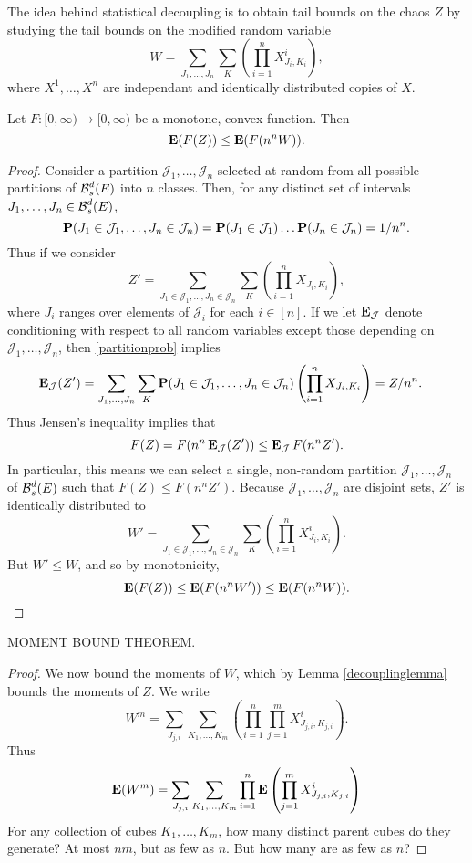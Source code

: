 The idea behind statistical decoupling is to obtain tail bounds on the chaos $Z$ by studying the tail bounds on the modified random variable
%
\[ W = \sum_{J_1, \dots, J_n} \sum_K \left( \prod_{i = 1}^n X_{J_i,K_i}^i \right), \]
%
where $X^1, \dots, X^n$ are independant and identically distributed copies of $X$.

\begin{lemma} \label{decouplinglemma}
	Let $F: [0,\infty) \to [0,\infty)$ be a monotone, convex function. Then
	\[ \operatorname{\mathbf{E}}(F(Z)) \leq \operatorname{\mathbf{E}}(F(n^n W)). \]
\end{lemma}
\begin{proof}
	Consider a partition $\mathcal{J}_1, \dots, \mathcal{J}_n$ selected at random from all possible partitions of $\operatorname{\mathcal{B}}^d_s(E)$ into $n$ classes. Then, for any distinct set of intervals $J_1, \dots, J_n \in \operatorname{\mathcal{B}}^d_s(E)$,
	\begin{equation} \label{partitionprob}
		\operatorname{\mathbf{P}}(J_1 \in \mathcal{J}_1, \dots, J_n \in \mathcal{J}_n) = \operatorname{\mathbf{P}}(J_1 \in \mathcal{J}_1) \dots \operatorname{\mathbf{P}}(J_n \in \mathcal{J}_n) = 1/n^n.
	\end{equation}
	Thus if we consider
	\[ Z' = \sum_{J_1 \in \mathcal{J}_1, \dots, J_n \in \mathcal{J}_n} \sum_K \left( \prod_{i = 1}^n X_{J_i,K_i} \right), \]
	where $J_i$ ranges over elements of $\mathcal{J}_i$ for each $i \in [n]$. If we let $\operatorname{\mathbf{E}}_{\mathcal{J}}$ denote conditioning with respect to all random variables except those depending on $\mathcal{J}_1, \dots, \mathcal{J}_n$, then \eqref{partitionprob} implies
	\begin{align*}
		\operatorname{\mathbf{E}}_{\mathcal{J}}(Z') &= \sum_{J_1, \dots, J_n} \sum_K \operatorname{\mathbf{P}}(J_1 \in \mathcal{J}_1, \dots, J_n \in \mathcal{J}_n) \left( \prod_{i = 1}^n X_{J_i,K_i} \right) = Z/n^n.
	\end{align*}
	Thus Jensen's inequality implies that
	\[ F(Z) = F(n^n \operatorname{\mathbf{E}}_{\mathcal{J}}(Z')) \leq \operatorname{\mathbf{E}}_{\mathcal{J}} F(n^n Z'). \]
	In particular, this means we can select a single, non-random partition $\mathcal{J}_1, \dots, \mathcal{J}_n$ of $\operatorname{\mathcal{B}}^d_s(E)$ such that $F(Z) \leq F(n^n Z')$. Because $\mathcal{J}_1, \dots, \mathcal{J}_n$ are disjoint sets, $Z'$ is identically distributed to
	\[ W' = \sum_{J_1 \in \mathcal{J}_1, \dots, J_n \in \mathcal{J}_n} \sum_K \left( \prod_{i = 1}^n X_{J_i,K_i}^i \right). \]
	But $W' \leq W$, and so by monotonicity,
	\[ \operatorname{\mathbf{E}}(F(Z)) \leq \operatorname{\mathbf{E}}(F(n^n W')) \leq \operatorname{\mathbf{E}}(F(n^n W)). \qedhere \]
\end{proof}

\begin{lemma}
	MOMENT BOUND THEOREM.
\end{lemma}
\begin{proof}
	We now bound the moments of $W$, which by Lemma \ref{decouplinglemma} bounds the moments of $Z$. We write
	\[ W^m = \sum_{J_{j,i}} \sum_{K_1, \dots, K_m} \left( \prod_{i = 1}^n \prod_{j = 1}^m X_{J_{j,i}, K_{j,i}}^i \right). \]
	Thus
	\[ \operatorname{\mathbf{E}}(W^m) = \sum_{J_{j,i}} \sum_{K_1, \dots, K_m} \prod_{i = 1}^n \operatorname{\mathbf{E}} \left( \prod_{j = 1}^m X_{J_{j,i}, K_{j,i}}^i \right) \]
	For any collection of cubes $K_1, \dots, K_m$, how many distinct parent cubes do they generate? At most $nm$, but as few as $n$. But how many are as few as $n$?
\end{proof}

